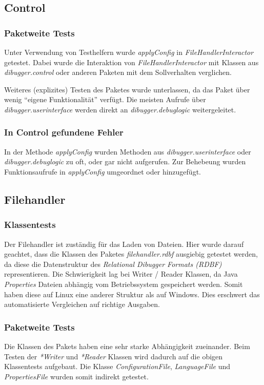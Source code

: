 \documentclass[parskip=full]{scrartcl}
\begin{document}
\subsection{Control}
\subsubsection{Paketweite Tests}
Unter Verwendung von Testhelfern wurde \textit{applyConfig} in \textit{FileHandlerInteractor} getestet.
Dabei wurde die Interaktion von \textit{FileHandlerInteractor} mit Klassen aus \textit{dibugger.control} oder anderen Paketen mit dem Sollverhalten verglichen.

Weiteres (explizites) Testen des Paketes wurde unterlassen, da das Paket über wenig \enquote{eigene Funktionalität} verfügt.
Die meisten Aufrufe über \textit{dibugger.userinterface} werden direkt an \textit{dibugger.debuglogic} weitergeleitet.
\subsubsection{In Control gefundene Fehler}
In der Methode \textit{applyConfig} wurden Methoden aus \textit{dibugger.userinterface} oder \textit{dibugger.debuglogic} zu oft, oder gar nicht aufgerufen.
Zur Behebeung wurden Funktionsaufrufe in \textit{applyConfig} umgeordnet oder hinzugefügt.
\subsection{Filehandler}
\subsubsection{Klassentests}
Der Filehandler ist zuständig für das Laden von Dateien. Hier wurde darauf geachtet, dass die Klassen des Paketes \textit{filehandler.rdbf} ausgiebig getestet werden, da diese die Datenstruktur des \textit{Relational Dibugger Formats (RDBF)} representieren.
Die Schwierigkeit lag bei Writer / Reader Klassen, da Java \textit{Properties} Dateien abhängig vom Betriebssystem gespeichert werden. Somit haben diese auf Linux eine anderer Struktur als auf Windows. Dies erschwert das automatisierte Vergleichen auf richtige Ausgaben.

\subsubsection{Paketweite Tests}
Die Klassen des Pakets haben eine sehr starke Abhängigkeit zueinander. Beim Testen der \textit{*Writer} und \textit{*Reader} Klassen wird dadurch auf die obigen Klassentests aufgebaut. Die Klasse \textit{ConfigurationFile}, \textit{LanguageFile} und \textit{PropertiesFile} wurden somit indirekt getestet.
\end{document}
